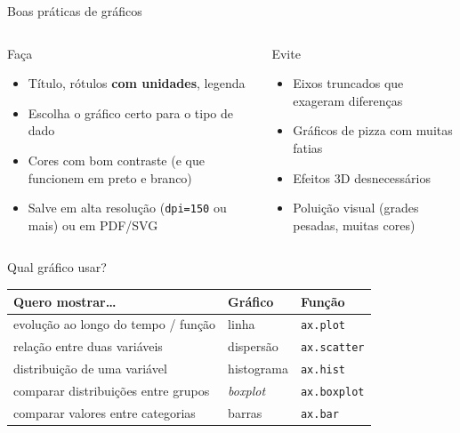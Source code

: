 \documentclass[aspectratio=169,10pt,t]{beamer}
\begin{document}
\begin{frame}{Boas práticas de gráficos}
  \begin{columns}[T]
    \begin{block}{Faça}
      \begin{itemize}\small
        \item Título, rótulos \textbf{com unidades}, legenda
        \item Escolha o gráfico certo para o tipo de dado
        \item Cores com bom contraste (e que funcionem em preto e branco)
        \item Salve em alta resolução (\texttt{dpi=150} ou mais) ou em PDF/SVG
      \end{itemize}
    \end{block}
    \begin{alertblock}{Evite}
      \begin{itemize}\small
        \item Eixos truncados que exageram diferenças
        \item Gráficos de pizza com muitas fatias
        \item Efeitos 3D desnecessários
        \item Poluição visual (grades pesadas, muitas cores)
      \end{itemize}
    \end{alertblock}
  \end{columns}
\end{frame}

\begin{frame}{Qual gráfico usar?}
  \centering\small
  \begin{tabular}{lll}
    \toprule
    Quero mostrar\ldots & Gráfico & Função\\
    \midrule
    evolução ao longo do tempo / função & linha & \texttt{ax.plot}\\
    relação entre duas variáveis & dispersão & \texttt{ax.scatter}\\
    distribuição de uma variável & histograma & \texttt{ax.hist}\\
    comparar distribuições entre grupos & \emph{boxplot} & \texttt{ax.boxplot}\\
    comparar valores entre categorias & barras & \texttt{ax.bar}\\
    \bottomrule
  \end{tabular}
\end{frame}
\end{document}
